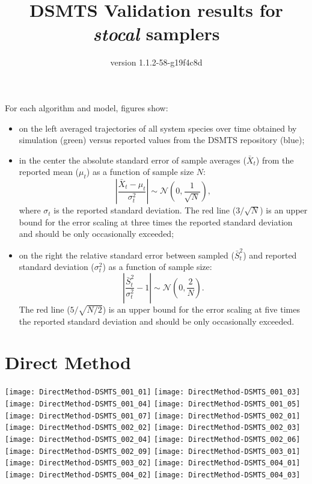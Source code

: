 \documentclass[notitlepage]{revtex4-1}
\begin{document}
\title{DSMTS Validation results for \textit{stocal} samplers}
\author{version 1.1.2-58-g19f4c8d}
\maketitle{}

For each algorithm and model, figures show:
\begin{itemize}
\item on the left averaged trajectories of all system species over time
obtained by simulation (green) versus reported values from the DSMTS
repository (blue);

\item in the center the absolute standard error of sample averages
($\bar X_{t}$) from the reported mean ($\mu_{t}$) as a function of
sample size $N$:
\[
	\left|\frac{\bar X_{t}-\mu_{t}}{\sigma_{t}^{2}}\right| \sim \mathcal{N}\left(0, \frac{1}{\sqrt{N}}\right),
\]
where $\sigma_{t}$ is the reported standard deviation.
The red line ($3/\sqrt{N}$) is an upper bound for the error scaling
at three times the reported standard deviation and should be only
occasionally exceeded;

\item on the right the relative standard error between sampled
($\bar S_{t}^{2}$) and reported standard deviation ($\sigma_{t}^{2}$)
as a function of sample size:
\[
	\left|\frac{\bar S_{t}^{2}}{\sigma_{t}^{2}} - 1\right| \sim \mathcal{N}\left(0, \frac{2}{N}\right) .
\]
The red line ($5/\sqrt{N/2}$) is an upper bound for the error scaling
at five times the reported standard deviation and should be only
occasionally exceeded.
\end{itemize}

\section{Direct Method}
\texttt{[image: DirectMethod-DSMTS\_001\_01]}
\texttt{[image: DirectMethod-DSMTS\_001\_03]}
\texttt{[image: DirectMethod-DSMTS\_001\_04]}
\texttt{[image: DirectMethod-DSMTS\_001\_05]}
\texttt{[image: DirectMethod-DSMTS\_001\_07]}
\texttt{[image: DirectMethod-DSMTS\_002\_01]}
\texttt{[image: DirectMethod-DSMTS\_002\_02]}
\texttt{[image: DirectMethod-DSMTS\_002\_03]}
\texttt{[image: DirectMethod-DSMTS\_002\_04]}
\texttt{[image: DirectMethod-DSMTS\_002\_06]}
\texttt{[image: DirectMethod-DSMTS\_002\_09]}
\texttt{[image: DirectMethod-DSMTS\_003\_01]}
\texttt{[image: DirectMethod-DSMTS\_003\_02]}
\texttt{[image: DirectMethod-DSMTS\_004\_01]}
\texttt{[image: DirectMethod-DSMTS\_004\_02]}
\texttt{[image: DirectMethod-DSMTS\_004\_03]}
\end{document}
